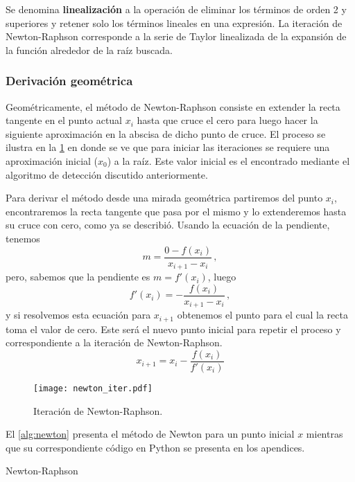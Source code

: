 \begin{tcolorbox}
Se denomina \textbf{linealización} a la operación de eliminar los términos de 
orden 2 y superiores y retener solo los términos lineales en una expresión. 
La iteración de Newton-Raphson corresponde a la serie de Taylor 
linealizada de la expansión de la función alrededor de la raíz buscada.
\end{tcolorbox}

\subsubsection*{Derivación geométrica}
Geométricamente, el método de Newton-Raphson consiste en extender la recta 
tangente en el punto actual $x_i$ hasta que cruce el cero para luego hacer la 
siguiente aproximación  en la abscisa de dicho punto de cruce. El proceso se 
ilustra en la \cref{fig:newton} en donde se ve que para iniciar las 
iteraciones se requiere una aproximación inicial ($x_0$) a la raíz. Este valor 
inicial es el encontrado mediante el algoritmo de detección discutido 
anteriormente.

Para derivar el método desde una mirada geométrica partiremos del punto $x_i$, 
encontraremos la recta tangente que pasa por el mismo y lo extenderemos hasta 
su cruce con cero, como ya se describió. Usando la ecuación de la pendiente, 
tenemos
\[m = \frac{0 - f(x_i)}{x_{i+1} - x_i}\, ,\]
pero, sabemos que la pendiente es $m = f'(x_i)$, luego
\[f'(x_i) = -\frac{f(x_i)}{x_{i + 1} - x_i}\, ,\]
y si resolvemos esta ecuación para $x_{i +1}$ obtenemos el punto para el cual 
la recta toma el valor de cero. Este será el nuevo punto inicial para repetir 
el proceso y correspondiente a la iteración de Newton-Raphson.
\begin{equation}
  x_{i + 1} = x_i - \frac{f(x_i)}{f'(x_i)}
  \label{eq:iteracion_newton}
\end{equation}

\begin{figure}[H]
\centering
\texttt{[image: newton\_iter.pdf]}
\caption{Iteración de Newton-Raphson.}
\label{fig:newton}
\end{figure}


 El \cref{alg:newton} presenta el método de Newton para un punto inicial $x$ 
 mientras que su correspondiente código en Python se presenta en los apendices.

\begin{algorithm}[H]
\SetAlgoLined
{}
\BlankLine
\caption{Newton-Raphson}
\label{alg:newton}
\end{algorithm}



